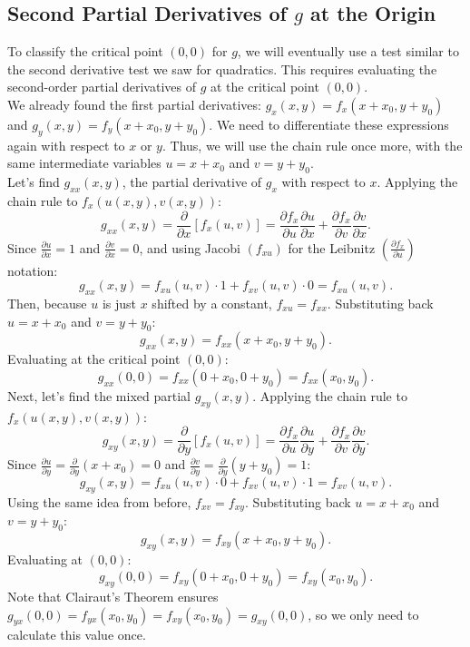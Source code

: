 \documentclass{article}
\newcommand{\mpfrac}[1]{\frac{\partial}{\partial #1}}
\newcommand{\bpfrac}[2]{\frac{\partial #1}{\partial #2}}
\begin{document}
\subsection{Second Partial Derivatives of \( g \) at the Origin}

To classify the critical point \( (0,0) \) for \( g \), we will eventually use a test similar to the second derivative test we saw for quadratics. This requires evaluating the second-order partial derivatives of \( g \) at the critical point \( (0,0) \). \\

We already found the first partial derivatives: \( g_{x}(x,y) = f_{x}(x + x_{0}, y + y_{0}) \) and \( g_{y}(x,y) = f_{y}(x + x_{0}, y + y_{0}) \). We need to differentiate these expressions again with respect to \( x \) or \( y \). Thus, we will use the chain rule once more, with the same intermediate variables \( u = x + x_{0} \) and \( v = y + y_{0} \). \\

Let's find \( g_{xx}(x,y) \), the partial derivative of \( g_{x} \) with respect to \( x \). Applying the chain rule to \( f_{x}(u(x,y), v(x,y)) \):
\[
	g_{xx} (x,y) = \mpfrac{x}[f_{x}(u,v)] = \bpfrac{f_{x}}{u} \bpfrac{u}{x} + \bpfrac{f_{x}}{v} \bpfrac{v}{x}.
\]
Since \( \bpfrac{u}{x} = 1 \) and \( \bpfrac{v}{x} = 0 \), and using Jacobi \( (f_{xu}) \) for the Leibnitz \( \left(\bpfrac{f_{x}}{u}\right) \) notation:
\[
	g_{xx}(x,y) = f_{xu}(u,v) \cdot 1 + f_{xv}(u,v) \cdot 0 = f_{xu}(u,v).
\]
Then, because \( u \) is just \( x \) shifted by a constant, \( f_{xu} = f_{xx} \). Substituting back \( u = x + x_{0} \) and \( v = y + y_{0} \):
\[
	g_{xx}(x,y) = f_{xx}(x + x_{0}, y + y_{0}).
\]
Evaluating at the critical point \( (0,0) \):
\[
	g_{xx}(0,0) = f_{xx}(0 + x_{0}, 0 + y_{0}) = f_{xx}(x_{0},y_{0}).
\]
Next, let's find the mixed partial \( g_{xy}(x,y) \). Applying the chain rule to \( f_{x}(u(x,y), v(x,y)) \):
\[
	g_{xy}(x,y) = \mpfrac{y}[f_{x}(u,v)] = \bpfrac{f_{x}}{u} \bpfrac{u}{y} + \bpfrac{f_{x}}{v} \bpfrac{v}{y}.
\]
Since \( \bpfrac{u}{y} = \mpfrac{y}(x + x_{0}) = 0 \) and \( \bpfrac{v}{y} = \mpfrac{y}(y + y_{0}) = 1 \):
\[
	g_{xy}(x,y) = f_{xu}(u,v) \cdot 0 + f_{xv}(u,v) \cdot 1 = f_{xv}(u,v).
\]
Using the same idea from before, \( f_{xv} = f_{xy} \). Substituting back \( u = x + x_{0} \) and \( v = y + y_{0} \):
\[
	g_{xy}(x,y) = f_{xy}(x + x_{0}, y + y_{0}).
\]
Evaluating at \( (0,0) \):
\[
	g_{xy}(0,0) = f_{xy}(0 + x_{0}, 0 + y_{0}) = f_{xy}(x_{0}, y_{0}).
\]
Note that Clairaut's Theorem ensures \( g_{yx}(0,0) = f_{yx}(x_0, y_0) = f_{xy}(x_0, y_0) = g_{xy}(0,0) \), so we only need to calculate this value once. \\
\end{document}
